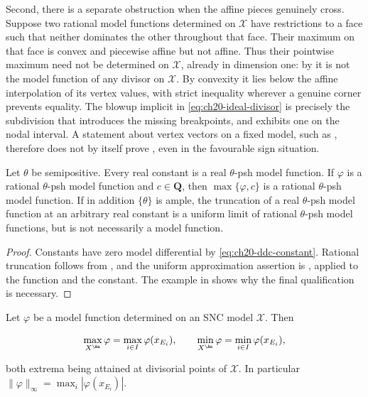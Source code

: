 \begin{example}
Second, there is a separate obstruction when the affine pieces genuinely
cross.  Suppose two rational model functions determined on $\mathcal X$
have restrictions to a face such that neither dominates the other
throughout that face.  Their maximum on that face is convex and piecewise
affine but not affine.  Thus their pointwise maximum need not be determined
on $\mathcal X$, already in dimension one: by
 it is not the model function of any
divisor on $\mathcal X$.  By convexity it lies below the affine
interpolation of its vertex values, with strict inequality wherever a
genuine corner prevents equality.  The blowup implicit in
\eqref{eq:ch20-ideal-divisor} is precisely the subdivision that introduces
the missing breakpoints, and  exhibits one on the
nodal interval.  A statement about vertex vectors on a fixed model, such as
, therefore does not by itself prove
, even in the favourable sign situation.
\end{example}

\begin{corollary}
\label{cor:ch20-truncation}
Let $\theta$ be semipositive.  Every real constant is a real
$\theta$-psh model function.  If $\varphi$ is a rational
$\theta$-psh model function and $c\in\mathbf Q$, then
$\max\{\varphi,c\}$ is a rational $\theta$-psh model function.
If in addition $\{\theta\}$ is ample, the truncation of a real
$\theta$-psh model function at an arbitrary real constant is a uniform
limit of rational $\theta$-psh model functions, but is not necessarily
a model function.
\end{corollary}

\begin{proof}
Constants have zero model differential by
\eqref{eq:ch20-ddc-constant}.  Rational truncation follows from
, and the uniform approximation assertion is
, applied to the function
and the constant.  The example in
 shows why the final
qualification is necessary.
\end{proof}

\begin{proposition}
\label{prop:ch20-maximum-principle}
Let $\varphi$ be a model function determined on an SNC model
$\mathcal X$.  Then

\begin{equation}
\label{eq:ch20-maximum-principle}
 \max_{X^{\An}}\varphi=\max_{i\in I}\varphi(x_{E_i}),
 \qquad
 \min_{X^{\An}}\varphi=\min_{i\in I}\varphi(x_{E_i}),
\end{equation}

both extrema being attained at divisorial points of $\mathcal X$.  In
particular $\|\varphi\|_\infty=\max_i|\varphi(x_{E_i})|$.
\end{proposition}

